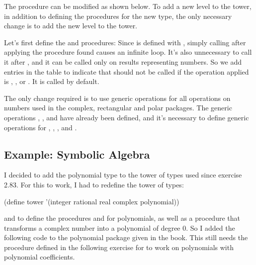 \begin{exe}[2.84]
    The  procedure can be modified as shown below. To add 
    a new level to the tower, in addition to defining the procedures for the new 
    type, the only necessary change is to add the new level to the tower.
\end{exe}

\begin{exe}[2.85]
    Let’s first define the  and  procedures:
    Since  is defined with , simply calling 
     after applying the procedure found causes an infinite loop. It’s 
    also unnecessary to call it after , and it can be called only 
    on results representing numbers. So we add entries in the table to indicate 
    that  should not be called if the operation applied is 
    , ,  or . It is called by 
    default.
\end{exe}

\begin{exe}[2.86]
    The only change required is to use generic operations for all operations on 
    numbers used in the complex, rectangular and polar packages. The generic 
    operations , ,  and  have already 
    been defined, and it’s necessary to define generic operations for 
    , , ,  and .
\end{exe}

\subsection{Example: Symbolic Algebra}

\begin{comp}
    I decided to add the polynomial type to the tower of types used since 
    exercise 2.83. For this to work, I had to redefine the tower of types:
    \begin{cscm}
        (define tower '(integer rational real complex polynomial))
    \end{cscm}
    and to define the procedures  and  for polynomials, 
    as well as a  procedure that transforms a complex number into 
    a polynomial of degree 0. So I added the following code to the polynomial 
    package given in the book. This still needs the  procedure 
    defined in the following exercise for  to work on polynomials 
    with polynomial coefficients.
\end{comp}

